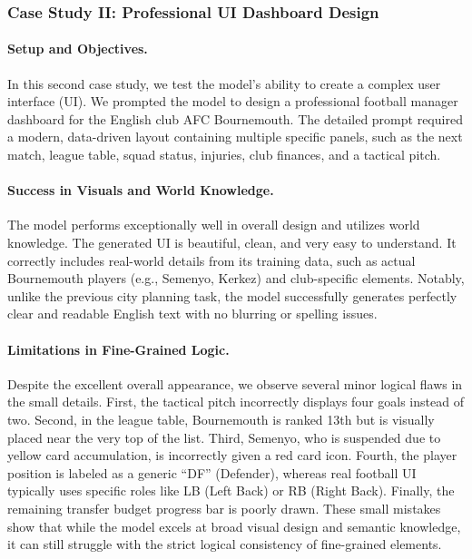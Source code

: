 \subsubsection{Case Study II: Professional UI Dashboard Design}
\paragraph{Setup and Objectives.} 
In this second case study, we test the model's ability to create a complex user interface (UI). We prompted the model to design a professional football manager dashboard for the English club AFC Bournemouth. The detailed prompt required a modern, data-driven layout containing multiple specific panels, such as the next match, league table, squad status, injuries, club finances, and a tactical pitch. 
\paragraph{Success in Visuals and World Knowledge.} 
The model performs exceptionally well in overall design and utilizes world knowledge. The generated UI is beautiful, clean, and very easy to understand. It correctly includes real-world details from its training data, such as actual Bournemouth players (e.g., Semenyo, Kerkez) and club-specific elements. Notably, unlike the previous city planning task, the model successfully generates perfectly clear and readable English text with no blurring or spelling issues.
\paragraph{Limitations in Fine-Grained Logic.} 
Despite the excellent overall appearance, we observe several minor logical flaws in the small details. First, the tactical pitch incorrectly displays four goals instead of two. Second, in the league table, Bournemouth is ranked 13th but is visually placed near the very top of the list. Third, Semenyo, who is suspended due to yellow card accumulation, is incorrectly given a red card icon. Fourth, the player position is labeled as a generic ``DF'' (Defender), whereas real football UI typically uses specific roles like LB (Left Back) or RB (Right Back). Finally, the remaining transfer budget progress bar is poorly drawn. These small mistakes show that while the model excels at broad visual design and semantic knowledge, it can still struggle with the strict logical consistency of fine-grained elements.

